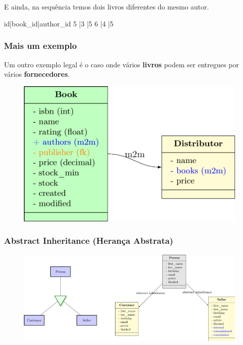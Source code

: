 \documentclass{beamer}
\begin{document}
{\begin{frame}[fragile]
\

\


E ainda, na sequência temos dois livros diferentes do mesmo autor.

\begin{bashcode}
id|book_id|author_id
5 |3	  	  |5
6 |4	  	  |5
\end{bashcode}

\end{frame}

\begin{frame}\frametitle{Mais um exemplo}	
Um outro exemplo legal é o caso onde vários \textbf{livros} podem ser entregues por vários \textbf{fornecedores}.

	\begin{figure}[h]
	  \centering
  		\includegraphics[height=.7\paperheight]{img/04m2m}
	\end{figure}

\end{frame}


\begin{frame}\frametitle{Abstract Inheritance (Herança Abstrata)}




	\begin{figure}[h]
	  \centering
  		\includegraphics[width=.93\paperwidth]{img/05abstract}
	\end{figure}


\end{frame}}
\end{document}
